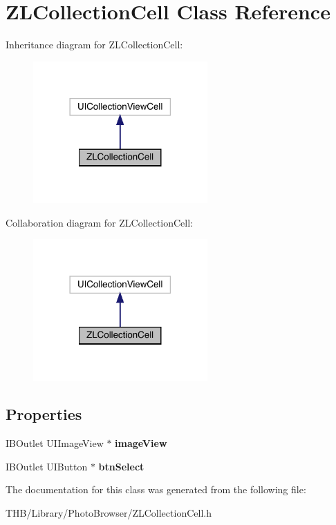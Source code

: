 \hypertarget{interface_z_l_collection_cell}{}\section{Z\+L\+Collection\+Cell Class Reference}
\label{interface_z_l_collection_cell}


Inheritance diagram for Z\+L\+Collection\+Cell\+:\nopagebreak
\begin{figure}[H]
\begin{center}
\leavevmode
\includegraphics[width=189pt]{interface_z_l_collection_cell__inherit__graph}
\end{center}
\end{figure}


Collaboration diagram for Z\+L\+Collection\+Cell\+:\nopagebreak
\begin{figure}[H]
\begin{center}
\leavevmode
\includegraphics[width=189pt]{interface_z_l_collection_cell__coll__graph}
\end{center}
\end{figure}
\subsection*{Properties}
\begin{DoxyCompactItemize}
\item 
\mbox{\label{interface_z_l_collection_cell_af7f1b2e5e4f4334968dd0edba7e15125}} 
I\+B\+Outlet U\+I\+Image\+View $\ast$ {\bfseries image\+View}
\item 
\mbox{\label{interface_z_l_collection_cell_afefd04da6d442a3c47fb1ca053f9d73a}} 
I\+B\+Outlet U\+I\+Button $\ast$ {\bfseries btn\+Select}
\end{DoxyCompactItemize}


The documentation for this class was generated from the following file\+:\begin{DoxyCompactItemize}
\item 
T\+H\+B/\+Library/\+Photo\+Browser/Z\+L\+Collection\+Cell.\+h\end{DoxyCompactItemize}
